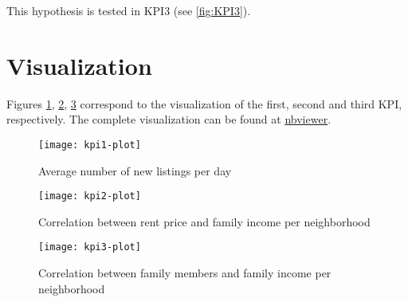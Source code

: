 \documentclass[12pt, a4paper]{article}
\begin{document}
This hypothesis is tested in KPI3 (see \ref{fig:KPI3}).

\section{Visualization}

Figures \ref{fig:kpi1-plot}, \ref{fig:kpi2-plot}, \ref{fig:kpi3-plot} correspond to the visualization of the first, second and third KPI, respectively. The complete visualization can be found at \href{https://nbviewer.jupyter.org/github/monadplus/bdm-project/blob/master/p2/visualization/visualization.ipynb}{nbviewer}.

\begin{figure}[H]
\centering
\texttt{[image: kpi1-plot]}
\caption{Average number of new listings per day}
\label{fig:kpi1-plot}
\end{figure}

\begin{figure}[H]
\centering
\texttt{[image: kpi2-plot]}
\caption{Correlation between rent price and family income per neighborhood}
\label{fig:kpi2-plot}
\end{figure}

\begin{figure}[H]
\centering
\texttt{[image: kpi3-plot]}
\caption{Correlation between family members and family income per neighborhood}
\label{fig:kpi3-plot}
\end{figure}
\end{document}
